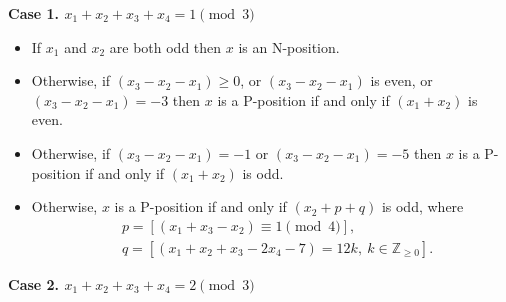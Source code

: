 \documentclass{article}
\theoremstyle{definition}
\begin{document}
\medskip


\textbf{Case 1. \boldmath $x_1 + x_2 + x_3 + x_4 = 1 \pmod 3$}

\begin{itemize}
    \item If $x_1$ and $x_2$ are both odd then $x$ is an N-position.
    \item Otherwise, if $(x_3 - x_2 - x_1) \geq 0$, or 
    $(x_3 - x_2 - x_1)$ is even, or $(x_3 - x_2 - x_1) = -3 $
    then $x$ is a P-position if and only if $(x_1 + x_2)$ is even.
    \item Otherwise, if $(x_3 - x_2 - x_1) = -1$ or $(x_3 - x_2 - x_1) = -5 $
    then $x$ is a P-position if and only if $(x_1 + x_2)$ is odd.
    \item Otherwise, $x$ is a P-position if and only if 
    $(x_2 + p + q)$ is odd, where
\[
\begin{aligned}
  & p = \left[(x_1 + x_3 - x_2) \equiv 1 \pmod 4 \right],\\
  & q = \left[(x_1 + x_2 + x_3 - 2x_4 - 7) = 12k,\ k \in \mathbb{Z}_{\geq 0} \right].
\end{aligned}
\]
\end{itemize}

\medskip

\textbf{Case 2. \boldmath $x_1 + x_2 + x_3 + x_4 = 2 \pmod 3$}
\end{document}

